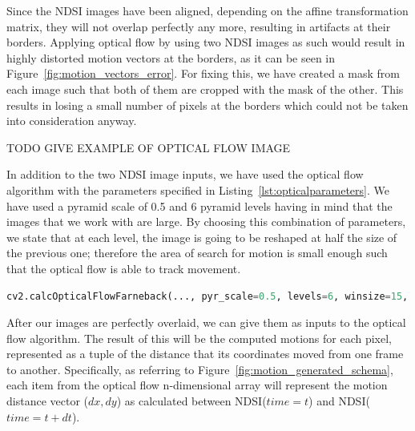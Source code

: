 \documentclass[11pt, a4paper]{report}
\begin{document}
	Since the NDSI images have been aligned, depending on the affine transformation matrix, they will not overlap perfectly any more, resulting in artifacts at their borders. Applying optical flow by using two NDSI images as such would result in highly distorted motion vectors at the borders, as it can be seen in Figure~\ref{fig:motion_vectors_error}. For fixing this, we have created a mask from each image such that both of them are cropped with the mask of the other. This results in losing a small number of pixels at the borders which could not be taken into consideration anyway.
	
	TODO GIVE EXAMPLE OF OPTICAL FLOW IMAGE
	
	In addition to the two NDSI image inputs, we have used the optical flow algorithm with the parameters specified in Listing~\ref{lst:opticalparameters}. We have used a pyramid scale of 0.5 and 6 pyramid levels having in mind that the images that we work with are large. By choosing this combination of parameters, we state that at each level, the image is going to be reshaped at half the size of the previous one; therefore the area of search for motion is small enough such that the optical flow is able to track movement.  

	\begin{lstlisting}[caption={Optical flow parameters},label={lst:opticalparameters},language=Python]
		cv2.calcOpticalFlowFarneback(..., pyr_scale=0.5, levels=6, winsize=15, iterations=3, poly_n=5, poly_sigma=1.2, flags=0)
	\end{lstlisting}

	After our images are perfectly overlaid, we can give them as inputs to the optical flow algorithm. The result of this will be the computed motions for each pixel, represented as a tuple of the distance that its coordinates moved from one frame to another. Specifically, as referring to Figure~\ref{fig:motion_generated_schema}, each item from the optical flow n-dimensional array will represent the motion distance vector (\(dx, dy\)) as calculated between NDSI(\(time=t\)) and NDSI(\(time=t + dt\)).
	
\end{document}
